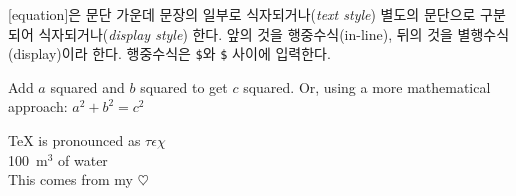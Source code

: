 [equation]은 문단 가운데 문장의 일부로 식자되거나(\emph{text style}) 별도의 문단으로 구분되어 식자되거나(\emph{display style}) 한다. 
앞의 것을 행중수식(in-line), 뒤의 것을 별행수식(display)이라 한다.
행중수식은 \texttt{\$}와 \texttt{\$} 사이에 입력한다.

\begin{example}
Add $a$ squared and $b$ squared
to get $c$ squared. Or, using 
a more mathematical approach:
$a^2 + b^2 = c^2$
\end{example}

\vspace{-.5\onelineskip}

\begin{example}
\TeX{} is pronounced as 
$\tau\epsilon\chi$\\[5pt]
100~m$^{3}$ of water\\[5pt]
This comes from my $\heartsuit$
\end{example}


